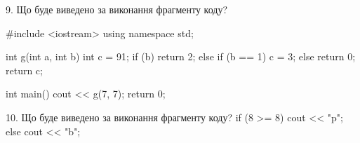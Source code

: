\documentclass[11pt, ukrainian]{article}
\begin{document}
\begin{large}

9. Що буде виведено за виконання фрагменту коду?

#include <iostream>
using namespace std;

int g(int a, int b){
    int c = 91;
    if (b)
        return 2;
    else if (b == 1)
         c = 3;
    else 
        return 0;
    return c;
}

int main(){
    cout << g(7, 7);
    return 0;
}


10. Що буде виведено за виконання фрагменту коду?
if (8 >= 8)
    cout << "p";
else
    cout << "b";


\end{large}
\newpage
\end{document}
